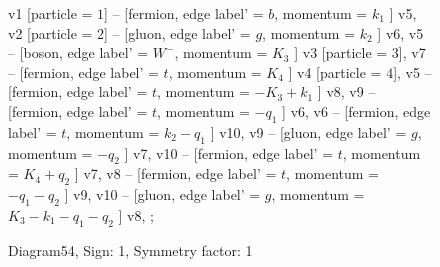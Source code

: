 \documentclass{revtex4}
\begin{document}
\begin{figure}[!htb]
\begin{center}
{    %
v1 [particle = \(1\)] -- [fermion, edge label' = \(b\), momentum = \(k_{1}\) ] v5, 
v2 [particle = \(2\)] -- [gluon, edge label' = \(g\), momentum = \(k_{2}\) ] v6, 
v5 -- [boson, edge label' = \(W^{-}\), momentum = \(K_{3}\) ] v3 [particle = \(3\)], 
v7 -- [fermion, edge label' = \(t\), momentum = \(K_{4}\) ] v4 [particle = \(4\)], 
v5 -- [fermion, edge label' = \(t\), momentum = \(-K_{3} + k_{1}\) ] v8, 
v9 -- [fermion, edge label' = \(t\), momentum = \(-q_{1}\) ] v6, 
v6 -- [fermion, edge label' = \(t\), momentum = \(k_{2} - q_{1}\) ] v10, 
v9 -- [gluon, edge label' = \(g\), momentum = \(-q_{2}\) ] v7, 
v10 -- [fermion, edge label' = \(t\), momentum = \(K_{4} + q_{2}\) ] v7, 
v8 -- [fermion, edge label' = \(t\), momentum = \(-q_{1} - q_{2}\) ] v9, 
v10 -- [gluon, edge label' = \(g\), momentum = \(K_{3} - k_{1} - q_{1} - q_{2}\) ] v8, 
};
\end{center}
\caption{Diagram54, Sign: 1, Symmetry factor: 1}
\end{figure}
\newpage
\end{document}
